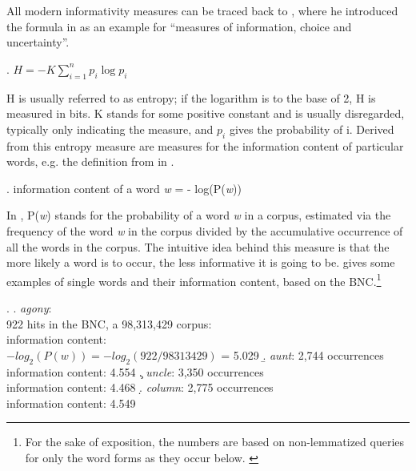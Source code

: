 All modern informativity measures can be traced back to
\citet[11]{Shannon:1948}, where he introduced the formula in \Next as an
example for ``measures of information, choice and uncertainty''.

\ex. $H = - K \sum_{i=1}^{n} p_i\; \mbox{log}\; p_i$

H is usually referred to as entropy; if the logarithm is to the
base of 2, H
is measured in bits. K stands for some positive constant and is usually
disregarded, typically only indicating the measure, and $p_i$ gives the
probability of i.  Derived from this entropy measure
are measures for the information content of particular
words, e.g. the definition from \citet[149]{PanandMcKeown:1999} in \Next.

\ex. information content of a word \emph{w} = - log(P(\emph{w}))

In \Last, P(\emph{w}) stands for the probability of a word \emph{w} in a corpus, estimated
via the frequency of the word \emph{w} in the corpus divided by the accumulative
occurrence of all the words in the corpus. The intuitive idea behind this
measure is that the more likely a word is to occur, the less informative it is
going to be. \Next gives some examples of single words and their
information content, based on the BNC.\footnote{For the sake of exposition, the
  numbers are based on non-lemmatized queries for only the word forms
  as they occur below. \label{foot:exposition}}

\ex. 
\a. \emph{agony}:\\ 922 hits in the BNC, a 98,313,429 corpus:\\
information content:\\ $- log_2 (P(w))= - log_2 (922/98313429)$ %
= 5.029 
\b. \emph{aunt}: 2,744 occurrences\\information content: 4.554 %
\c. \emph{uncle}: 3,350 occurrences\\information content: 4.468 %
\d. \emph{column}: 2,775 occurrences\\information content:  4.549%

